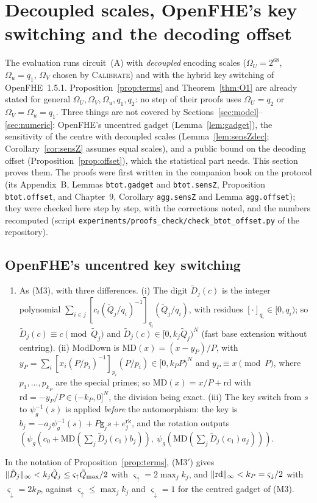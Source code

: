 \section{Decoupled scales, OpenFHE's key switching and the decoding offset}
\label{sec:general}

The evaluation runs circuit~(A) with \emph{decoupled} encoding scales ($\Omega_U=2^{68}$, $\Omega_u=q_1$, $\Omega_V$ chosen by \textsc{Calibrate}) and with the hybrid key switching of OpenFHE~1.5.1. Proposition~\ref{prop:terms} and Theorem~\ref{thm:O1} are already stated for general $\Omega_U,\Omega_V,\Omega_u,q_1,q_2$: no step of their proofs uses $\Omega_U=q_2$ or $\Omega_V=\Omega_u=q_1$. Three things are not covered by Sections~\ref{sec:model}--\ref{sec:numeric}: OpenFHE's uncentred gadget (Lemma~\ref{lem:gadget}), the sensitivity of the centre with decoupled scales (Lemma~\ref{lem:sensZdec}; Corollary~\ref{cor:sensZ} assumes equal scales), and a public bound on the decoding offset (Proposition~\ref{prop:offset}), which the statistical part needs. This section proves them. The proofs were first written in the companion book on the protocol (its Appendix~B, Lemmas \texttt{btot.gadget} and \texttt{btot.sensZ}, Proposition \texttt{btot.offset}, and Chapter~9, Corollary \texttt{agg.sensZ} and Lemma \texttt{agg.offset}); they were checked here step by step, with the corrections noted, and the numbers recomputed (script \texttt{experiments/proofs\_check/check\_btot\_offset.py} of the repository).

\subsection{OpenFHE's uncentred key switching}

\begin{enumerate}[nosep,label=(M3$'$)]
  \item As (M3), with three differences. (i) The digit $\tilde D_j(c)$ is the integer polynomial $\sum_{i\in j}[c_i(\tilde Q_j/q_i)^{-1}]_{q_i}(\tilde Q_j/q_i)$, with residues $[\cdot]_{q_i}\in[0,q_i)$; so $\tilde D_j(c)\equiv c\pmod{\tilde Q_j}$ and $\tilde D_j(c)\in[0,k_j\tilde Q_j)^N$ (fast base extension without centring). (ii) ModDown is $\mathrm{MD}(x)=(x-y_P)/P$, with $y_P=\sum_{i}[x_i(P/p_i)^{-1}]_{p_i}(P/p_i)\in[0,k_PP)^N$ and $y_P\equiv x\pmod P$, where $p_1,\dots,p_{k_P}$ are the special primes; so $\mathrm{MD}(x)=x/P+\mathrm{rd}$ with $\mathrm{rd}=-y_P/P\in(-k_P,0]^N$, the division being exact. (iii) The key switch from $s$ to $\psi_g^{-1}(s)$ is applied \emph{before} the automorphism: the key is $b_j=-a_j\psi_g^{-1}(s)+P\mathsf g_js+e^{\mathrm{rk}}_j$, and the rotation outputs $(\psi_g(c_0+\mathrm{MD}(\sum_j\tilde D_j(c_1)b_j)),\ \psi_g(\mathrm{MD}(\sum_j\tilde D_j(c_1)a_j)))$.
\end{enumerate}
In the notation of Proposition~\ref{prop:terms}, (M3$'$) gives $\lVert \tilde D_j\rVert_\infty<k_j\tilde Q_j\le\varsigma_\uparrow\tilde Q_{\max}/2$ with $\varsigma_\uparrow=2\max_jk_j$, and $\lVert \mathrm{rd}\rVert_\infty<k_P=\varsigma_\downarrow/2$ with $\varsigma_\downarrow=2k_P$, against $\varsigma_\uparrow\le\max_jk_j$ and $\varsigma_\downarrow=1$ for the centred gadget of (M3).

